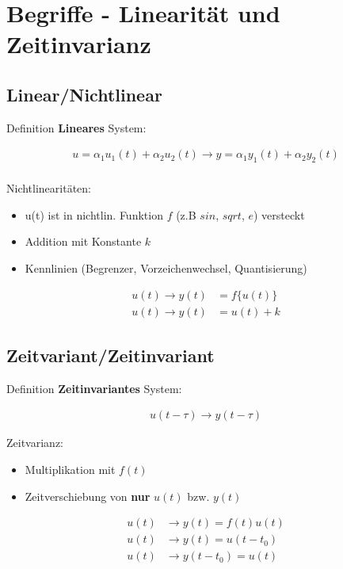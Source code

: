 \documentclass[10pt,a4paper]{article}
\begin{document}
\twocolumn
\pagestyle{fancy}
\section{Begriffe - Linearität und Zeitinvarianz}
  \subsection{Linear/Nichtlinear}
  Definition \textbf{Lineares} System:
  \begin{mdframed}[style=exercise]
    \begin{align}
        u = \alpha_1 u_1(t)+ \alpha_2 u_2(t)\rightarrow y = \alpha_1 y_1(t)+ \alpha_2 y_2(t) \\  
    \end{align}
  \end{mdframed}
  Nichtlinearitäten: 
  \begin{itemize}
    \item u(t) ist in nichtlin. Funktion $f$ (z.B $sin$, $sqrt$, $e$) versteckt
    \item Addition mit Konstante $k$
    \item Kennlinien (Begrenzer, Vorzeichenwechsel, Quantisierung)
  \end{itemize}
  \begin{mdframed}[style=exercise]
    \begin{align}
        u(t)\rightarrow y(t) &= f\{u(t)\} \\
        u(t)\rightarrow y(t) &= u(t) + k
    \end{align}
  \end{mdframed}

  \subsection{Zeitvariant/Zeitinvariant}
  Definition \textbf{Zeitinvariantes} System:
  \begin{mdframed}[style=exercise]
    \begin{align}
        u(t-\tau) \rightarrow y(t-\tau)
    \end{align}
  \end{mdframed}
  Zeitvarianz: 
  \begin{itemize}
    \item Multiplikation mit $f(t)$
    \item Zeitverschiebung von \textbf{nur} $u(t)$ bzw. $y(t)$
  \end{itemize}
  \begin{mdframed}[style=exercise]
    \begin{align}
        u(t) &\rightarrow y(t) = f(t)u(t)\\
        u(t) &\rightarrow y(t) = u(t-t_0)\\
        u(t) &\rightarrow y(t-t_0) = u(t)
    \end{align}
  \end{mdframed}
\end{document}
